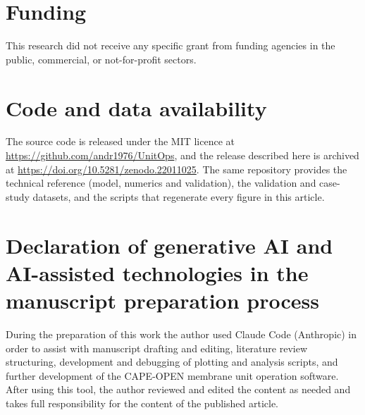 \documentclass[a4paper,fleqn]{cas-dc}
\begin{document}
\section*{Funding}
This research did not receive any specific grant from funding agencies in the
public, commercial, or not-for-profit sectors.

\section*{Code and data availability}
The source code is released under the MIT licence at
\url{https://github.com/andr1976/UnitOps}, and the
release described here is archived at \url{https://doi.org/10.5281/zenodo.22011025}.
The same repository provides
the technical reference (model, numerics and validation), the validation and
case-study datasets, and the scripts that regenerate every figure in this article.

\section*{Declaration of generative AI and AI-assisted technologies in the manuscript preparation process}
During the preparation of this work the author used Claude Code (Anthropic) in
order to assist with manuscript drafting and editing, literature review
structuring, development and debugging of plotting and analysis scripts, and
further development of the CAPE-OPEN membrane unit operation software. After using
this tool, the author reviewed and edited the content as needed and takes full
responsibility for the content of the published article.



\end{document}
